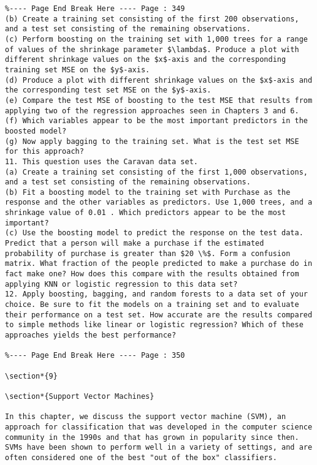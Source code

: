 \documentclass[10pt]{article}
\begin{document}
\begin{verbatim}
%---- Page End Break Here ---- Page : 349
(b) Create a training set consisting of the first 200 observations, and a test set consisting of the remaining observations.
(c) Perform boosting on the training set with 1,000 trees for a range of values of the shrinkage parameter $\lambda$. Produce a plot with different shrinkage values on the $x$-axis and the corresponding training set MSE on the $y$-axis.
(d) Produce a plot with different shrinkage values on the $x$-axis and the corresponding test set MSE on the $y$-axis.
(e) Compare the test MSE of boosting to the test MSE that results from applying two of the regression approaches seen in Chapters 3 and 6.
(f) Which variables appear to be the most important predictors in the boosted model?
(g) Now apply bagging to the training set. What is the test set MSE for this approach?
11. This question uses the Caravan data set.
(a) Create a training set consisting of the first 1,000 observations, and a test set consisting of the remaining observations.
(b) Fit a boosting model to the training set with Purchase as the response and the other variables as predictors. Use 1,000 trees, and a shrinkage value of 0.01 . Which predictors appear to be the most important?
(c) Use the boosting model to predict the response on the test data. Predict that a person will make a purchase if the estimated probability of purchase is greater than $20 \%$. Form a confusion matrix. What fraction of the people predicted to make a purchase do in fact make one? How does this compare with the results obtained from applying KNN or logistic regression to this data set?
12. Apply boosting, bagging, and random forests to a data set of your choice. Be sure to fit the models on a training set and to evaluate their performance on a test set. How accurate are the results compared to simple methods like linear or logistic regression? Which of these approaches yields the best performance?

%---- Page End Break Here ---- Page : 350

\section*{9}

\section*{Support Vector Machines}

In this chapter, we discuss the support vector machine (SVM), an approach for classification that was developed in the computer science community in the 1990s and that has grown in popularity since then. SVMs have been shown to perform well in a variety of settings, and are often considered one of the best "out of the box" classifiers.


\end{verbatim}
\end{document}
